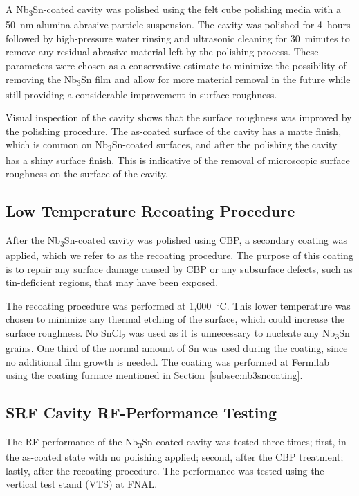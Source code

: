 \documentclass[reprint,amsmath,amssymb,aps]{revtex4-2}%
\begin{document}
A Nb\textsubscript{3}Sn-coated cavity was polished using the felt cube polishing media with a 50~nm alumina abrasive particle suspension. The cavity was polished for 4~hours followed by high-pressure water rinsing and ultrasonic cleaning for 30~minutes to remove any residual abrasive material left by the polishing process. These parameters were chosen as a conservative estimate to minimize the possibility of removing the Nb\textsubscript{3}Sn film and allow for more material removal in the future while still providing a considerable improvement in surface roughness.

Visual inspection of the cavity shows that the surface roughness was improved by the polishing procedure. The as-coated surface of the cavity has a matte finish, which is common on Nb\textsubscript{3}Sn-coated surfaces, and after the polishing the cavity has a shiny surface finish. This is indicative of the removal of microscopic surface roughness on the surface of the cavity.
%
\subsection{Low Temperature Recoating Procedure}%
\label{subsec:recoating}%
After the Nb\textsubscript{3}Sn-coated cavity was polished using CBP, a secondary coating was applied, which we refer to as the recoating procedure. The purpose of this coating is to repair any surface damage caused by CBP or any subsurface defects, such as tin-deficient regions, that may have been exposed.

The recoating procedure was performed at 1,000~°C. This lower temperature was chosen to minimize any thermal etching of the surface, which could increase the surface roughness. No SnCl\textsubscript{2} was used as it is unnecessary to nucleate any Nb\textsubscript{3}Sn grains. One third of the normal amount of Sn was used during the coating, since no additional film growth is needed. The coating was performed at Fermilab using the coating furnace mentioned in Section~\ref{subsec:nb3sncoating}.

%
\subsection{SRF Cavity RF-Performance Testing}%
\label{subsec:vts}%
The RF performance of the Nb\textsubscript{3}Sn-coated cavity was tested three times; first, in the as-coated state with no polishing applied; second, after the CBP treatment; lastly, after the recoating procedure. The performance was tested using the vertical test stand (VTS) at FNAL\cite{pischalnikov2014rf}.
\end{document}
